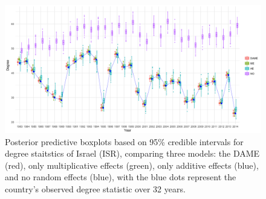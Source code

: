 \documentclass[a4paper]{article}
\begin{document}
\begin{figure}[H]
	\begin{center}
		\includegraphics[width=1\textwidth]{plots/ISR31.png}	
	\end{center}
	\caption {Posterior predictive boxplots based on 95\% credible intervals for degree staitstics of Israel (ISR), comparing three models: the DAME (red), only multiplicative effects (green), only additive effects (blue), and no random effects (blue), with the blue dots represent the country's observed degree statistic over 32 years.}
	\label{figure:modelvalidation}
\end{figure}
\end{document}
